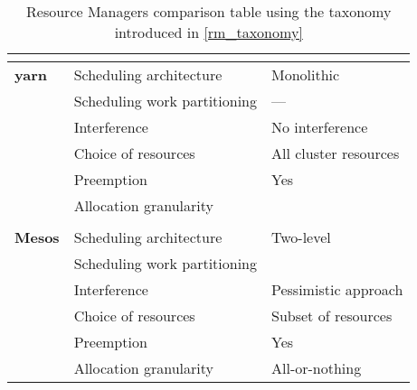 \begin{table}[h]
\begin{center}
\begin{tabular}{lll}
\multicolumn{3}{c}{} \\ \hline
\multicolumn{1}{l|}{\textbf{\glsdesc{yarn}}} 
                                   & Scheduling architecture      & Monolithic              \\ \cline{2-3} 
\multicolumn{1}{l|}{}              & Scheduling work partitioning & ---                     \\ \cline{2-3} 
\multicolumn{1}{l|}{}              & Interference                 & No interference         \\ \cline{2-3} 
\multicolumn{1}{l|}{}              & Choice of resources          & All cluster resources   \\ \cline{2-3} 
\multicolumn{1}{l|}{}              & Preemption                   & Yes                     \\ \cline{2-3} 
\multicolumn{1}{l|}{}              & Allocation granularity       &                         \\ \cline{2-3}

\multicolumn{3}{c}{} \\ \hline
\multicolumn{1}{l|}{\textbf{Mesos \cite{mesos}}} 
                                   & Scheduling architecture      & Two-level               \\ \cline{2-3} 
\multicolumn{1}{l|}{}              & Scheduling work partitioning &                         \\ \cline{2-3} 
\multicolumn{1}{l|}{}              & Interference                 & Pessimistic approach    \\ \cline{2-3} 
\multicolumn{1}{l|}{}              & Choice of resources          & Subset of resources     \\ \cline{2-3} 
\multicolumn{1}{l|}{}              & Preemption                   & Yes                     \\ \cline{2-3} 
\multicolumn{1}{l|}{}              & Allocation granularity       & All-or-nothing                    

\end{tabular}
\end{center}
\caption{Resource Managers comparison table using the taxonomy introduced in \autoref{rm_taxonomy}}
\label{rm-comparison}
\end{table}